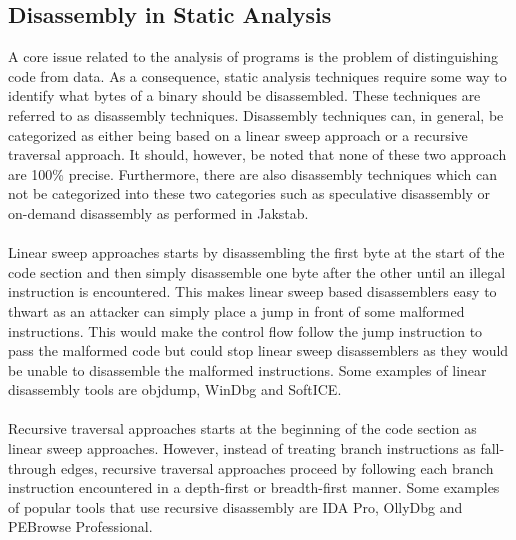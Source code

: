\documentclass{kththesis}
\begin{document}
\subsection{Disassembly in Static Analysis}
A core issue related to the analysis of programs is the problem of distinguishing code from data\cite{ABinaryRewriting}. As a consequence, static analysis techniques require some way to identify what bytes of a binary should be disassembled. These techniques are referred to as disassembly techniques. Disassembly techniques can, in general, be categorized as either being based on a linear sweep approach or a recursive traversal approach\cite{DisassemblyOfExecutable}. It should, however, be noted that none of these two approach are 100\% precise\cite{ABinaryRewriting}. Furthermore, there are also disassembly techniques which can not be categorized into these two categories such as speculative disassembly\cite{preciseCFG} or on-demand disassembly as performed in Jakstab\cite{Jakstab}.
\\ \\
Linear sweep approaches starts by disassembling the first byte at the start of the code section and then simply disassemble one byte after the other until an illegal instruction is encountered\cite{ABinaryRewriting}. This makes linear sweep based disassemblers easy to thwart as an attacker can simply place a jump in front of some malformed instructions. This would make the control flow follow the jump instruction to pass the malformed code but could stop linear sweep disassemblers as they would be unable to disassemble the malformed instructions\cite{ABinaryRewriting}. Some examples of linear disassembly tools are objdump, WinDbg and SoftICE\cite{ReversingSecretsofReverseEngineering}.
\\ \\ 
Recursive traversal approaches starts at the beginning of the code section as linear sweep approaches. However, instead of treating branch instructions as fall-through edges, recursive traversal approaches proceed by following each branch instruction encountered in a depth-first or breadth-first manner. Some examples of popular tools that use recursive disassembly are IDA Pro, OllyDbg and PEBrowse Professional\cite{ReversingSecretsofReverseEngineering}.
\end{document}

